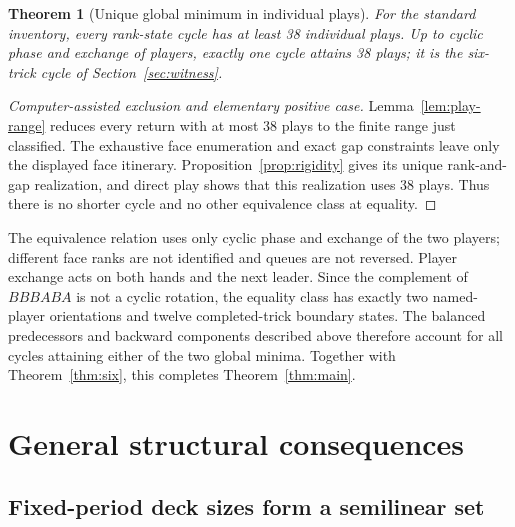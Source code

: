 \documentclass[11pt]{article}
\newtheorem{theorem}{Theorem}
\begin{document}
\begin{theorem}[Unique global minimum in individual plays]\label{thm:plays}
For the standard inventory, every rank-state cycle has at least 38 individual
plays. Up to cyclic phase and exchange of players, exactly one cycle attains
38 plays; it is the six-trick cycle of Section~\ref{sec:witness}.
\end{theorem}
\begin{proof}[Computer-assisted exclusion and elementary positive case]
Lemma~\ref{lem:play-range} reduces every return with at most 38 plays to the
finite range just classified. The exhaustive face enumeration and exact gap
constraints leave only the displayed face itinerary.
Proposition~\ref{prop:rigidity} gives its unique rank-and-gap realization,
and direct play shows that this realization uses 38 plays. Thus there is
no shorter cycle and no other equivalence class at equality.
\end{proof}

The equivalence relation uses only cyclic phase and exchange of the two
players; different face ranks are not identified and queues are not reversed.
Player exchange acts on both hands and the next leader. Since the complement
of $BBBABA$ is not a cyclic rotation, the equality class has exactly two
named-player orientations and twelve completed-trick boundary states. The
balanced predecessors and backward components described above therefore
account for all cycles attaining either of the two global minima. Together
with Theorem~\ref{thm:six}, this completes Theorem~\ref{thm:main}.

\section{General structural consequences}

\subsection{Fixed-period deck sizes form a semilinear set}
\end{document}
